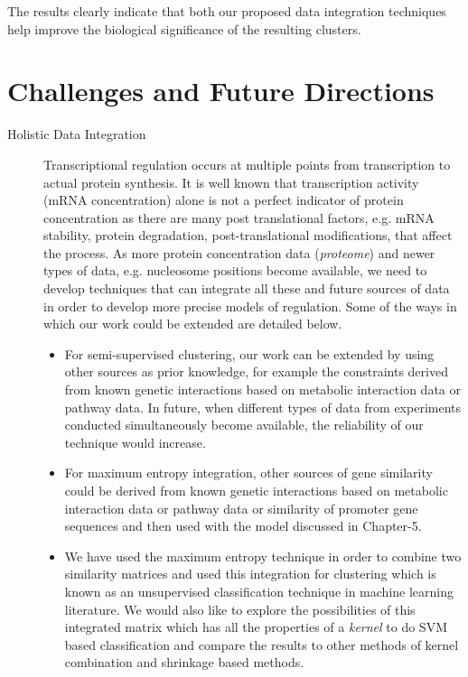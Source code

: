 The results clearly indicate that both our proposed data integration techniques help improve the biological significance of the resulting clusters.
\section{Challenges and Future Directions}
\begin{description}
\item[Holistic Data Integration] Transcriptional regulation occurs at multiple points from transcription to actual protein synthesis. It is well known that transcription activity (\ac{mRNA} concentration) alone is not a perfect indicator of protein concentration \citep{Griffin02Complementary} as there are many post translational factors, e.g. \ac{mRNA} stability, protein degradation, post-translational modifications, that affect the process. As more protein concentration data (\textit{proteome}) and newer types of data, e.g. nucleosome positions \citep{segal2007genomiccode,field2008distinct,kaplan2008nucleosome} become available, we need to develop techniques that can integrate all these and future sources of data in order to develop more precise models of regulation. Some of the ways in which our work could be extended are detailed below.
\begin{itemize}
    \item For semi-supervised clustering, our work can be extended by using other sources as prior knowledge, for example the constraints derived from known genetic interactions based on metabolic interaction data or pathway data. In future, when different types of data from experiments conducted simultaneously become available, the reliability of our technique would increase.

    \item For maximum entropy integration, other sources of gene similarity could be derived from known genetic interactions based on metabolic interaction data or pathway data or similarity of promoter gene sequences \citep{jean2006kernels} and then used with the model discussed in Chapter-5.

    \item We have used the maximum entropy technique in order to combine two similarity matrices and used this integration for clustering which is known as an unsupervised classification technique in machine learning literature. We would also like to explore the possibilities of this integrated matrix which has all the properties of a \textit{kernel} to do SVM based classification and compare the results to other methods of kernel combination \citep{lanck04kerneldatafusion} and shrinkage based methods.


\end{itemize}
\end{description}
